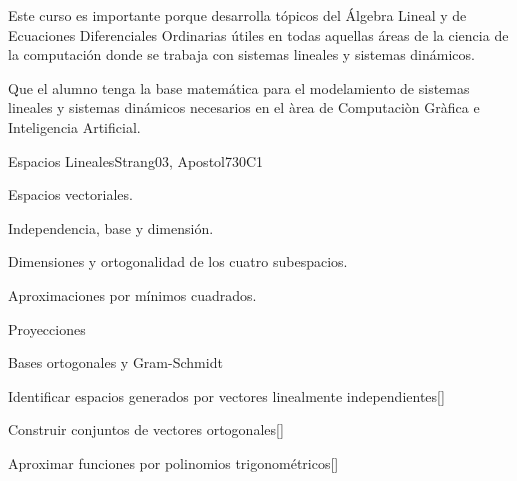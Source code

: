 \begin{syllabus}


\begin{justification}
Este curso es importante porque desarrolla tópicos del Álgebra Lineal y de Ecuaciones Diferenciales Ordinarias útiles en todas aquellas áreas de la ciencia de la computación donde se trabaja con sistemas lineales y sistemas dinámicos.
\end{justification}

\begin{goals}
\item Que el alumno tenga la base matemática para el modelamiento de sistemas lineales y sistemas dinámicos necesarios en el àrea de Computaciòn Gràfica e Inteligencia Artificial.
\end{goals}

\begin{outcomes}
  \item {}
  \item {}
  \item {}
\end{outcomes}

\begin{competences}
    \item {} 
    \item {}
    \item {}
\end{competences}

\begin{unit}{Espacios Lineales}{}{Strang03, Apostol73}{0}{C1}
\begin{topics}
      \item Espacios vectoriales.
      \item Independencia, base y dimensión.
      \item Dimensiones y ortogonalidad de los cuatro subespacios.
      \item Aproximaciones por mínimos cuadrados.
      \item Proyecciones
      \item Bases ortogonales y Gram-Schmidt
   \end{topics}
   \begin{learningoutcomes}
      \item Identificar espacios generados por vectores linealmente independientes[\Usage]
      \item Construir conjuntos de vectores ortogonales[\Usage]
      \item Aproximar funciones por polinomios trigonométricos[\Usage]
   \end{learningoutcomes}
\end{unit}


\end{syllabus}
